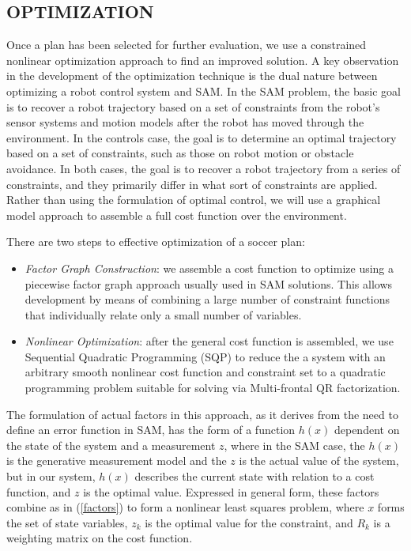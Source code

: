 \documentclass[a4paper, 10pt, conference]{ieeeconf}      %
\begin{document}
\subsection{OPTIMIZATION}
Once a plan has been selected for further evaluation, we use a constrained nonlinear optimization approach to find an improved solution.  A key observation in the development of the optimization technique is the dual nature between optimizing a robot control system and SAM.  In the SAM problem, the basic goal is to recover a robot trajectory based on a set of constraints from the robot's sensor systems and motion models after the robot has moved through the environment.  In the controls case, the goal is to determine an optimal trajectory based on a set of constraints, such as those on robot motion or obstacle avoidance.  In both cases, the goal is to recover a robot trajectory from a series of constraints, and they primarily differ in what sort of constraints are applied.  Rather than using the formulation of optimal control, we will use a graphical model approach to assemble a full cost function over the environment.  

There are two steps to effective optimization of a soccer plan:
\begin{itemize}
 \item \textit{Factor Graph Construction}: we assemble a cost function to optimize using a piecewise factor graph approach usually used in SAM solutions.  This allows development by means of combining a large number of constraint functions that individually relate only a small number of variables.
\item \textit{Nonlinear Optimization}: after the general cost function is assembled, we use Sequential Quadratic Programming (SQP) to reduce the a system with an arbitrary smooth nonlinear cost function and constraint set to a quadratic programming problem suitable for solving via Multi-frontal QR factorization.  
 \end{itemize}

The formulation of actual factors in this approach, as it derives from the need to define an error function in SAM, has the form of a function $h(x)$ dependent on the state of the system and a measurement $z$, where in the SAM case, the $h(x)$ is the generative measurement model and the $z$ is the actual value of the system, but in our system, $h(x)$ describes the current state with relation to a cost function, and $z$ is the optimal value.  Expressed in general form, these factors combine as in (\ref{factors}) to form a nonlinear least squares problem, where $x$ forms the set of state variables, $z_{k}$ is the optimal value for the constraint, and $R_{k}$ is a weighting matrix on the cost function.
\end{document}
